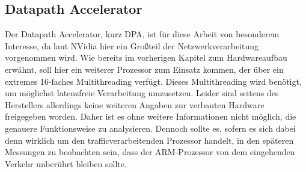 \subsection{Datapath Accelerator}
Der Datapath Accelerator, kurz DPA, ist für diese Arbeit von besonderem Interesse, da laut NVidia hier ein Großteil der Netzwerkverarbeitung vorgenommen wird. Wie bereits im vorherigen Kapitel zum Hardwareaufbau erwähnt, soll hier ein weiterer Prozessor zum Einsatz kommen, der über ein extremes 16-faches Multithreading verfügt. Dieses Multithreading wird benötigt, um möglichst latenzfreie Verarbeitung umzusetzen. \cite{nvidia_dpa_subsystem_2025} Leider sind seitens des Herstellers allerdings keine weiteren Angaben zur verbauten Hardware freigegeben worden. Daher ist es ohne weitere Informationen nicht möglich, die genauere Funktionsweise zu analysieren. Dennoch sollte es, sofern es sich dabei denn wirklich um den trafficverarbeitenden Prozessor handelt, in den späteren Messungen zu beobachten sein, dass der ARM-Prozessor von dem eingehenden Verkehr unberührt bleiben sollte.

